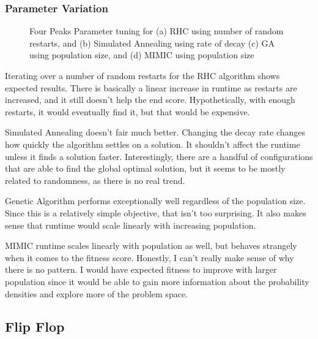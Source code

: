 \documentclass[
	letterpaper, %
]{mlreport}
\begin{document}
\subsubsection{Parameter Variation}
\begin{figure}
	\centering
	\caption{Four Peaks Parameter tuning for (a) RHC using number of random restarts, and (b) Simulated Annealing using rate of decay (c) GA using population size, and (d) MIMIC using population size}
	\label{fig:fig2}
\end{figure}
Iterating over a number of random restarts for the RHC algorithm shows expected results. There is basically a linear increase in runtime as restarts are increased, and it still doesn't help the end score. Hypothetically, with enough restarts, it would eventually find it, but that would be expensive.

Simulated Annealing doesn't fair much better. Changing the decay rate changes how quickly the algorithm settles on a solution. It shouldn't affect the runtime unless it finds a solution faster. Interestingly, there are a handful of configurations that are able to find the global optimal solution, but it seems to be mostly related to randomness, as there is no real trend.

Genetic Algorithm performs exceptionally well regardless of the population size. Since this is a relatively simple objective, that isn't too surprising. It also makes sense that runtime would scale linearly with increasing population.

MIMIC runtime scales linearly with population as well, but behaves strangely when it comes to the fitness score. Honestly, I can't really make sense of why there is no pattern. I would have expected fitness to improve with larger population since it would be able to gain more information about the probability densities and explore more of the problem space.

\subsection{Flip Flop}
\end{document}

